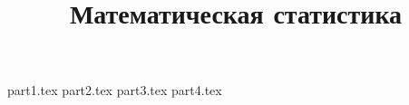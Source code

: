 

\title{Математическая статистика}

\makeindex



\maketitle
{part1.tex}
{part2.tex}
{part3.tex}
{part4.tex}


\printindex
\tableofcontents

